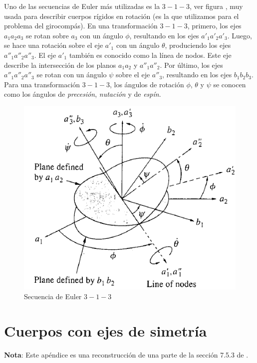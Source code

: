 \documentclass[a4paper,10pt]{article}
\numberwithin{equation}{section}
\begin{document}
Uno de las secuencias de Euler más utilizadas es la $3-1-3$, ver figura , muy usada para describir 
cuerpos rígidos en rotación (es la que utilizamos para el problema del girocompás). En 
una transformación $3-1-3$, primero, los ejes $a_1a_2a_3$ se rotan sobre $a_3$ 
con un ángulo $\phi$, resultando en los ejes $a'_1a'_2a'_3$. Luego, se hace una rotación 
sobre el eje $a'_1$ con un ángulo $\theta$, produciendo los ejes $a''_1a''_2a''_3$. 
El eje $a'_1$ también es conocido como la línea de nodos. Este eje describe la 
intersección de los planos $a_1a_2$ y $a''_1a''_2$. Por último, los ejes $a''_1a''_2a''_3$ 
se rotan con un ángulo $\psi$ sobre el eje $a''_3$, resultando en los ejes $b_1b_2b_3$.
Para una transformación $3-1-3$, los ángulos de rotación $\phi$, $\theta$ y $\psi$ se 
conocen como los ángulos de \emph{precesión}, \emph{nutación} y de \emph{espín}.


\begin{figure}[H]
\center 
\includegraphics[scale=0.38]{apendice2fig1}
\caption{Secuencia de Euler $3-1-3$}
\label{fig:apendice2fig1}
\end{figure}

\newpage

\section{Cuerpos con ejes de simetría} \label{app:apendice3}

\textbf{Nota}: Este apéndice es una reconstrucción de una parte de la sección 7.5.3 
de \cite{baruh}.
\end{document}
